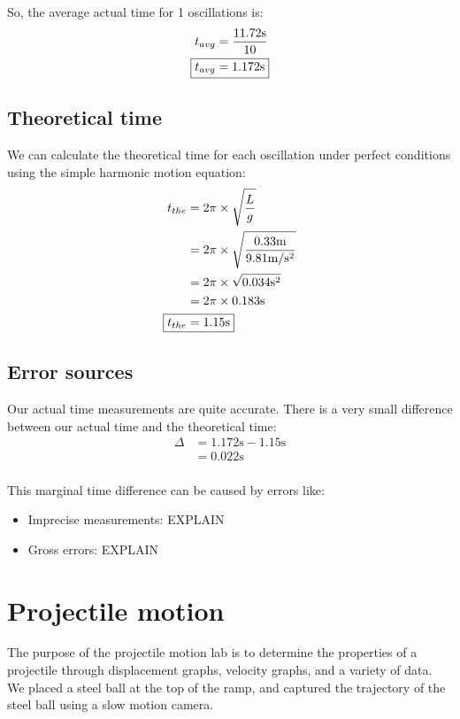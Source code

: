 \documentclass[a4paper,12pt]{article}
\begin{document}
	So, the average actual time for 1 oscillations is:
	\begin{align*}
		t_{avg}&=\frac{11.72\text{s}}{10}\\
		\Aboxed{t_{avg}&=1.172\text{s}}
	\end{align*}
	
	\subsection{Theoretical time}
	We can calculate the theoretical time for each oscillation under perfect conditions using the simple harmonic motion equation:
	\begin{align*}
		t_{the}&=2\pi\times\sqrt{\frac{L}{g}}\\
		&=2\pi\times\sqrt{\frac{0.33\text{m}}{9.81\text{m}/\text{s}^2}}  \\
		&=2\pi\times\sqrt{0.034\text{s}^2}\\
		&=2\pi\times 0.183\text{s} \\
		\Aboxed{t_{the}&=1.15\text{s}}
	\end{align*} 
	
	\subsection{Error sources}
	Our actual time measurements are quite accurate. There is a very small difference between our actual time and the theoretical time:
	\begin{align*}
		\Delta&=1.172\text{s}-1.15\text{s} \\
		&=0.022\text{s}\\
	\end{align*}
	
	This marginal time difference can be caused by errors like:
	\begin{itemize}
		\item Imprecise measurements: EXPLAIN
		\item Gross errors: EXPLAIN
	\end{itemize}
	
	\newpage
	
	\section{Projectile motion}
	The purpose of the projectile motion lab is to determine the properties of a projectile through displacement graphs, velocity graphs, and a variety of data. We placed a steel ball at the top of the ramp, and captured the trajectory of the steel ball using a slow motion camera.
	
\end{document}
